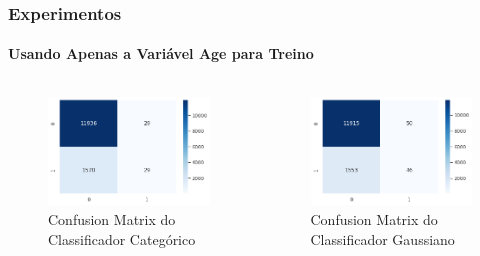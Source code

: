 \documentclass{beamer}
\begin{document}
\begin{frame}
    \frametitle{Experimentos}
    \framesubtitle{Usando Apenas a Variável Age para Treino}
    \begin{columns}
        \begin{column}{0.5\textwidth}
            \begin{figure}[H]
                \centerline{\includegraphics[width=1.0\textwidth]{IMGS/cm-cnb-age-only.png}}
                
                \caption{\label{fig:cm2-cnb}Confusion Matrix do Classificador Categórico}
            \end{figure}
        \end{column}
        \begin{column}{0.5\textwidth}
            \begin{figure}[H]
                \centerline{\includegraphics[width=1.0\textwidth]{IMGS/cm-gnb-age-only.png}}
                \caption{\label{fig:cm2-gnb}Confusion Matrix do Classificador Gaussiano}
            \end{figure}
        \end{column}
        \end{columns}    
\end{frame}
\end{document}
